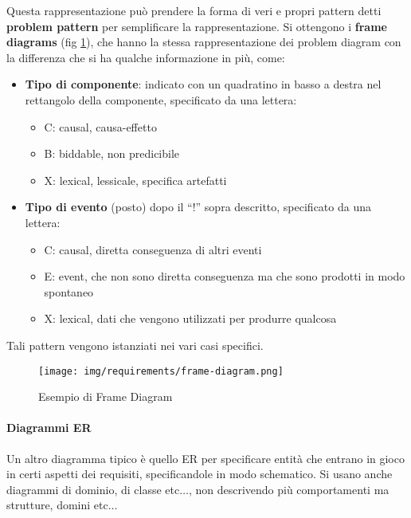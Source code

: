 Questa rappresentazione può prendere la forma di veri e propri pattern detti
\textbf{problem pattern} per semplificare la rappresentazione. Si ottengono i
\textbf{frame diagrams} (fig \ref{fig:frame-diagram}), che hanno la stessa
rappresentazione dei problem diagram con la differenza che si ha qualche informazione
in più, come:
\begin{itemize}
      \item \textbf{Tipo di componente}: indicato con un quadratino in basso a
            destra nel rettangolo della componente, specificato da una lettera:
            \begin{itemize}
                  \item C: causal, causa-effetto
                  \item B: biddable, non predicibile
                  \item X: lexical, lessicale, specifica artefatti
            \end{itemize}
      \item \textbf{Tipo di evento} (posto) dopo il “!” sopra descritto,
            specificato da una lettera:
            \begin{itemize}
                  \item C: causal, diretta conseguenza di altri eventi
                  \item E: event, che non sono diretta conseguenza ma che sono
                        prodotti in modo spontaneo
                  \item X: lexical, dati che vengono utilizzati per produrre
                        qualcosa
            \end{itemize}
\end{itemize}
Tali pattern vengono istanziati nei vari casi specifici.
\begin{figure}[!ht]
      \centering
      \texttt{[image: img/requirements/frame-diagram.png]}
      \caption{Esempio di Frame Diagram}
      \label{fig:frame-diagram}
\end{figure}
\paragraph{Diagrammi ER}
Un altro diagramma tipico è quello ER per specificare entità che entrano in gioco
in certi aspetti dei requisiti, specificandole in modo schematico. Si usano anche
diagrammi di dominio, di classe etc$\dots$, non descrivendo più comportamenti
ma strutture, domini etc$\dots$
